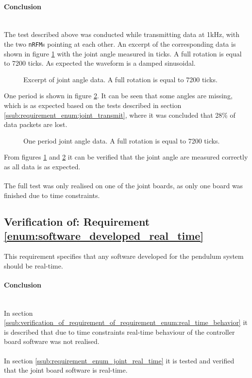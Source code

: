 \paragraph{Conclusion}~\\
The test described above was conducted while transmitting data at 1kHz, with the two \texttt{nRFM}s pointing at each other.
An excerpt of the corresponding data is shown in figure \ref{fig:joint_angle_measured_full} with the joint angle measured in ticks.
A full rotation is equal to 7200 ticks.
As expected the waveform is a damped sinusoidal.
\begin{figure}[h]
	\centering
	
	\caption[Excerpt of joint angle data]{Excerpt of joint angle data. A full rotation is equal to 7200 ticks.}
	\label{fig:joint_angle_measured_full}
\end{figure}
One period is shown in figure \ref{fig:joint_angle_measured_zoom}.
It can be seen that some angles are missing, which is as expected based on the tests described in section \ref{ssub:requirement_enum:joint_transmit}, where it was concluded that 28\% of data packets are lost.
\begin{figure}[h]
	\centering
	
	\caption[One period joint angle data]{One period joint angle data. A full rotation is equal to 7200 ticks.}
	\label{fig:joint_angle_measured_zoom}
\end{figure}
From figures \ref{fig:joint_angle_measured_full} and \ref{fig:joint_angle_measured_zoom} it can be verified that the joint angle are measured correctly as all data is as expected.
\\~\\
The full test was only realised on one of the joint boards, as only one board was finished due to time constraints.


\subsection{Verification of: Requirement \ref{enum:software_developed_real_time}} %
\label{sub:verification_of_requirement_enum:software_developed_real_time}
This requirement specifies that any software developed for the pendulum system should be real-time.

\paragraph{Conclusion}~\\
In section \ref{ssub:verification_of_requirement_of_requirement_enum:real_time_behavior} it is described that due to time constraints real-time behaviour of the controller board software was not realised.
\\~\\
In section \ref{ssub:requirement_enum_joint_real_time} it is tested and verified that the joint board software is real-time.


